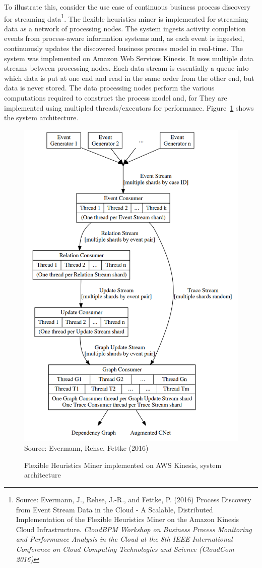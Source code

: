 To illustrate this, consider the use case of continuous business process discovery for streaming data\footnote{Source: Evermann, J., Rehse, J.-R., and Fettke, P. (2016) Process Discovery from Event Stream Data in the Cloud - A Scalable, Distributed Implementation of the Flexible Heuristics Miner on the Amazon Kinesis Cloud Infrastructure. \emph{CloudBPM Workshop on Business Process Monitoring and Performance Analysis in the Cloud at the 8th IEEE International Conference on Cloud Computing Technologies and Science (CloudCom 2016)}}. The flexible heuristics miner is implemented for streaming data as a network of processing nodes. The system ingests activity completion events from process-aware information systems and, as each event is ingested, continuously updates the discovered business process model in real-time. The system was implemented on Amazon Web Services Kinesis. It uses multiple data streams between processing nodes. Each data stream is essentially a queue into which data is put at one end and read in the same order from the other end, but data is never stored. The data processing nodes perform the various computations required to construct the process model and, for  They are implemented using multipled threads/executors for performance. Figure~\ref{fig:fhmkinesis} shows the system architecture. 

\begin{figure}
\centering

\includegraphics[width=.6\textwidth]{screen3.png} \\

\scriptsize Source: Evermann, Rehse, Fettke (2016)\normalsize
\caption[FHM on AWS Kinesis -- system architecture]{Flexible Heuristics Miner implemented on AWS Kinesis, system architecture}
\label{fig:fhmkinesis}
\end{figure}

